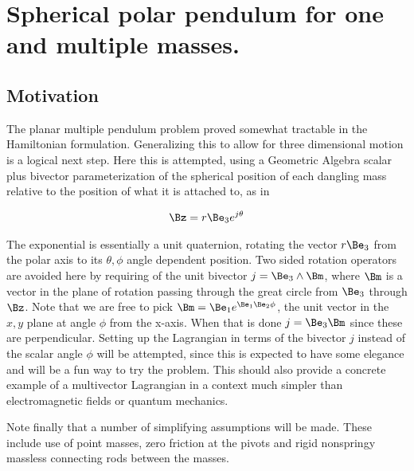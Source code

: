 

\chapter{Spherical polar pendulum for one and multiple masses.}
\label{chap:sPolarMultiPendulum}
{}
\date{Oct 27, 2009}

\beginArtWithToc

\section{Motivation}

The planar multiple pendulum problem proved somewhat tractable in the Hamiltonian formulation.  Generalizing this to allow for three dimensional motion is a logical next step.  Here this is attempted, using a Geometric Algebra scalar plus bivector parameterization of the spherical position of each dangling mass relative to the position of what it is attached to, as in

\begin{align}\label{eqn:sPolarMultiPendulum:zoo1}
\Bz = r \Be_3 e^{j\theta}
\end{align}

The exponential is essentially a unit quaternion, rotating the vector $r \Be_3$ from the polar axis to its $\theta,\phi$ angle dependent position.  Two sided rotation operators are avoided here by requiring of the unit bivector $j = \Be_3 \wedge \Bm$, where $\Bm$ is a vector in the plane of rotation passing through the great circle from $\Be_3$ through $\Bz$.  Note that we are free to pick $\Bm = \Be_1 e^{\Be_1 \Be_2 \phi}$, the unit vector in the $x,y$ plane at angle $\phi$ from the x-axis.  When that is done $j = \Be_3 \Bm$ since these are perpendicular.  Setting up the Lagrangian in terms of the bivector $j$ instead of the scalar angle $\phi$ will be attempted, since this is expected to have some elegance and will be a fun way to try the problem.  This should also provide a concrete example of a multivector Lagrangian in a context much simpler than electromagnetic fields or quantum mechanics.

Note finally that a number of simplifying assumptions will be made.  These include use of point masses, zero friction at the pivots and rigid nonspringy massless connecting rods between the masses.

